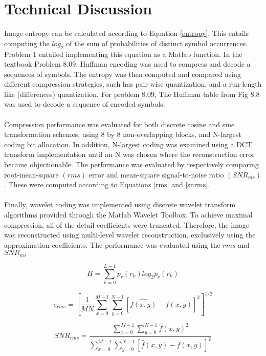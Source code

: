 \documentclass[./rarnold_project_89.tex]{subfiles}
\begin{document}
\clearpage

\section*{Technical Discussion}

\noindent Image entropy can be calculated according to Equation \eqref{entropy}.  This entails computing the $log_2$ of the sum of probabilities of distinct symbol occurrences.  Problem 1 entailed implementing this equation as a Matlab function.  In the textbook Problem 8.09, Huffman encoding was used to compress and decode a sequences of symbols.  The entropy was then computed and compared using different compression strategies, such has pair-wise quantization, and a run-length like (differences) quantization. For problem 8.09, The Huffman table from Fig 8.8 was used to decode a sequence of encoded symbols.
\\ \\
\noindent Compression performance was evaluated for both discrete cosine and sine transformation schemes, using 8 by 8 non-overlapping blocks, and N-largest coding bit allocation.  In addition, N-largest coding was examined using a DCT transform implementation until an N was chosen where the reconstruction error became objectionable.  The performance was evaluated by respectively comparing root-mean-square $(rms)$ error and mean-square signal-to-noise ratio $(SNR_{ms})$.  These were computed according to Equations \eqref{rms} and \eqref{snrms}.  
\\ \\
\noindent Finally, wavelet coding was implemented using discrete wavelet transform algorithms provided through the Matlab Wavelet Toolbox.  To achieve maximal compression, all of the detail coefficients were truncated.  Therefore, the image was reconstructed using multi-level wavelet reconstruction, exclusively using the approximation coefficients.  The performance was evaluated using the $rms$ and $SNR_{ms}$


\begin{equation}
\label{entropy}
\tilde{H} = \sum_{k=0}^{L-1} p_{r}(r_{k})log_2p_r(r_k) 
\end{equation}

\begin{equation}
\label{rms}
e_{rms} = \left[ \frac{1}{MN} \sum_{x=0}^{M-1} \sum_{y=0}^{N-1} [\hat{f(x,y)} - f(x,y)]^{2}\right ]^{1/2}
\end{equation}

\begin{equation}
\label{snrms}
SNR_{rms} = \frac{\sum_{x=0}^{M-1}\sum_{y=0}^{N-1} \hat{f}(x,y)^2}{\sum_{x=0}^{M-1}\sum_{y=0}^{N-1} [\hat{f}(x,y) - f(x,y)]^2}
\end{equation}
\end{document}
